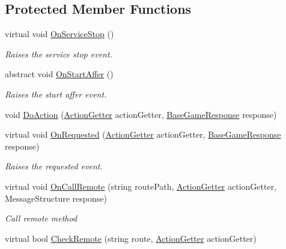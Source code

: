 \subsection*{Protected Member Functions}
\begin{DoxyCompactItemize}
\item 
virtual void \mbox{\hyperlink{class_t_net_1_1_contract_1_1_game_base_host_a82c725fe21b4ceeacbfe86dbacd48827}{On\+Service\+Stop}} ()
\begin{DoxyCompactList}\small\item\em Raises the service stop event. \end{DoxyCompactList}\item 
abstract void \mbox{\hyperlink{class_t_net_1_1_contract_1_1_game_base_host_a2941f10ee11c805eaa395c602c4f3399}{On\+Start\+Affer}} ()
\begin{DoxyCompactList}\small\item\em Raises the start affer event. \end{DoxyCompactList}\item 
void \mbox{\hyperlink{class_t_net_1_1_contract_1_1_game_base_host_ab6647ea8762677ab23df4be03043b00e}{Do\+Action}} (\mbox{\hyperlink{class_t_net_1_1_service_1_1_action_getter}{Action\+Getter}} action\+Getter, \mbox{\hyperlink{class_t_net_1_1_service_1_1_base_game_response}{Base\+Game\+Response}} response)
\item 
virtual void \mbox{\hyperlink{class_t_net_1_1_contract_1_1_game_base_host_a2a726288c921c8743a426fbc3ae2ccb9}{On\+Requested}} (\mbox{\hyperlink{class_t_net_1_1_service_1_1_action_getter}{Action\+Getter}} action\+Getter, \mbox{\hyperlink{class_t_net_1_1_service_1_1_base_game_response}{Base\+Game\+Response}} response)
\begin{DoxyCompactList}\small\item\em Raises the requested event. \end{DoxyCompactList}\item 
virtual void \mbox{\hyperlink{class_t_net_1_1_contract_1_1_game_base_host_a04444ec9b97c907dc7bc49dbdfcc6ee1}{On\+Call\+Remote}} (string route\+Path, \mbox{\hyperlink{class_t_net_1_1_service_1_1_action_getter}{Action\+Getter}} action\+Getter, Message\+Structure response)
\begin{DoxyCompactList}\small\item\em Call remote method \end{DoxyCompactList}\item 
virtual bool \mbox{\hyperlink{class_t_net_1_1_contract_1_1_game_base_host_af31cfeb1a622a263f4d32bd56f41bc64}{Check\+Remote}} (string route, \mbox{\hyperlink{class_t_net_1_1_service_1_1_action_getter}{Action\+Getter}} action\+Getter)

\end{DoxyCompactItemize}
